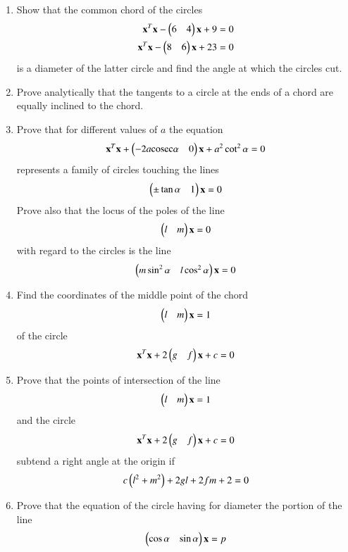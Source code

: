\begin{enumerate}[label=\arabic*.,ref=\thesubsection.\theenumi]
\item Show that the common chord of the circles
\begin{align}
\mathbf{x}^T\mathbf{x}-\begin{pmatrix}6 & 4\end{pmatrix}\mathbf{x}+9 = 0
\\
\mathbf{x}^T\mathbf{x}-\begin{pmatrix}8 & 6\end{pmatrix}\mathbf{x}+23 = 0
\end{align}
is a diameter of the latter circle and find the angle at which the circles cut.
\item Prove analytically that the tangents to a circle at the ends of a chord are equally inclined to the chord.
\item Prove that for different values of $a$ the equation
\begin{align}
\mathbf{x}^T\mathbf{x}+\begin{pmatrix}-2a\text{cosec}\alpha & 0\end{pmatrix}\mathbf{x}+a^2\cot^2\alpha = 0
\end{align}
represents a family of circles touching the lines 
\begin{align}
\begin{pmatrix}\pm\tan\alpha & 1\end{pmatrix}\mathbf{x} = 0
\end{align}
%
Prove also that the locus of the poles of the line 
\begin{align}
\begin{pmatrix}l & m\end{pmatrix}\mathbf{x} = 0
\end{align}
 with regard to the circles is the line
\begin{align}
\begin{pmatrix}m\sin^2\alpha & l\cos^2\alpha\end{pmatrix}\mathbf{x}=0
\end{align}
\item Find the coordinates of the middle point of the chord 
\begin{align}
\begin{pmatrix}l & m\end{pmatrix}\mathbf{x} = 1
\end{align}
of the circle
\begin{align}
\mathbf{x}^T\mathbf{x}+2\begin{pmatrix}g & f\end{pmatrix}\mathbf{x}+c = 0
\end{align}
\item Prove that the points of intersection of the line 
\begin{align}
\begin{pmatrix}l & m\end{pmatrix}\mathbf{x} = 1
\end{align}
and the circle
\begin{align}
\mathbf{x}^T\mathbf{x}+2\begin{pmatrix}g & f\end{pmatrix}\mathbf{x}+c = 0
\end{align}
subtend a right angle at the origin if
\begin{align}
c\left(l^2+m^2\right)+2gl+2fm+2=0
\end{align}
\item Prove that the equation of the circle having for diameter the portion of the line 
\begin{align}
\myvec{\cos\alpha & \sin\alpha}\vec{x} = p

\end{align}
\end{enumerate}
